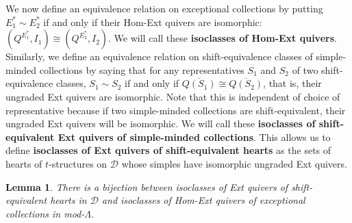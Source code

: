 \documentclass[12pt]{amsart}
\newtheorem{lem}[thm]{Lemma}
\theoremstyle{definition}
\theoremstyle{remark}
\numberwithin{equation}{section}
\newcommand{\cD}{\ensuremath{{\mathcal{D}}}}
\begin{document}
We now define an equivalence relation on exceptional collections by putting $E^*_1 \sim E^*_2$ if and only if their Hom-Ext quivers are isomorphic: $(Q^{E^*_1},I_1)\cong (Q^{E^*_2},I_2)$. We will call these \textbf{isoclasses of Hom-Ext quivers}. Similarly, we define an equivalence relation on shift-equivalence classes of simple-minded collections by saying that for any representatives $S_1$ and $S_2$ of two shift-equivalence classes, $S_1\sim S_2$ if and only if $\overline{Q(S_1)} \cong \overline{Q(S_2)}$, that is, their ungraded Ext quivers are isomorphic. Note that this is independent of choice of representative because if two simple-minded collections are shift-equivalent, their ungraded Ext quivers will be isomorphic. We will call these \textbf{isoclasses of shift-equivalent Ext quivers of simple-minded collections}. This allows us to define \textbf{isoclasses of Ext quivers of shift-equivalent hearts} as the sets of hearts of $t$-structures on $\cD$ whose simples have isomorphic ungraded Ext quivers.

\begin{lem}\label{lem: ec and hearts}
    There is a bijection between isoclasses of Ext quivers of shift-equivalent hearts in $\cD$ and isoclasses of Hom-Ext quivers of exceptional collections in mod-$\Lambda$. 
\end{lem}
\end{document}
